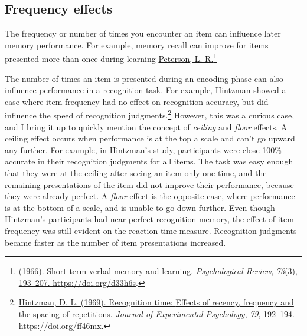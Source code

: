 \documentclass[
  oneside,
  12pt]{crumpbook}
\begin{document}
\hypertarget{frequency-effects}{%
\subsection{Frequency effects}\label{frequency-effects}}

The frequency or number of times you encounter an item can influence later memory performance. For example, memory recall can improve for items presented more than once during learning \protect\hyperlink{ref-petersonShorttermVerbalMemory1966}{Peterson, L. R.}\footnote{\protect\hyperlink{ref-petersonShorttermVerbalMemory1966}{(1966). Short-term verbal memory and learning. \emph{Psychological Review}, \emph{73}(3), 193--207. \url{https://doi.org/d33h6s}}.}

The number of times an item is presented during an encoding phase can also influence performance in a recognition task. For example, Hintzman showed a case where item frequency had no effect on recognition accuracy, but did influence the speed of recognition judgments.\footnote{\protect\hyperlink{ref-hintzmanRecognitionTimeEffects1969}{Hintzman, D. L. (1969). Recognition time: {Effects} of recency, frequency and the spacing of repetitions. \emph{Journal of Experimental Psychology}, \emph{79}, 192--194. \url{https://doi.org/ff46mx}}.} However, this was a curious case, and I bring it up to quickly mention the concept of \emph{ceiling} and \emph{floor} effects. A ceiling effect occurs when performance is at the top a scale and can't go upward any further. For example, in Hintzman's study, participants were close 100\% accurate in their recognition judgments for all items. The task was easy enough that they were at the ceiling after seeing an item only one time, and the remaining presentations of the item did not improve their performance, because they were already perfect. A \emph{floor} effect is the opposite case, where performance is at the bottom of a scale, and is unable to go down further. Even though Hintzman's participants had near perfect recognition memory, the effect of item frequency was still evident on the reaction time measure. Recognition judgments became faster as the number of item presentations increased.
\end{document}
